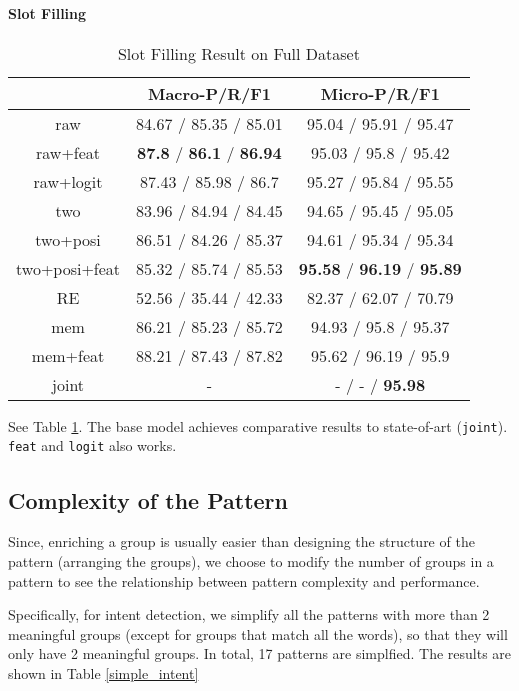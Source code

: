 \paragraph{Slot Filling}
\begin{table}
\setlength{\tabcolsep}{0.23em}
\centering
\small{
\begin{tabular}{|c|c|c|}

\hline
  & Macro-P/R/F1 & Micro-P/R/F1  \\
\hline
raw &  84.67 / 85.35 / 85.01            & 95.04 / 95.91 / 95.47  \\
\hline
raw+feat & \textbf{87.8} / \textbf{86.1} / \textbf{86.94} & 95.03 / 95.8 / 95.42  \\
\hline
raw+logit & 87.43 / 85.98 / 86.7        & 95.27 / 95.84 / 95.55  \\
\hline
two & 83.96 / 84.94 / 84.45             & 94.65 / 95.45 / 95.05 \\
\hline
two+posi & 86.51 / 84.26 / 85.37        & 94.61 / 95.34 / 95.34  \\
\hline
two+posi+feat & 85.32 / 85.74 / 85.53   & \textbf{95.58} / \textbf{96.19} / \textbf{95.89} \\
\hline
\hline
RE & 52.56 / 35.44 / 42.33 & 82.37 / 62.07 / 70.79 \\
\hline
mem & 86.21 / 85.23 / 85.72 & 94.93 / 95.8 / 95.37 \\
\hline
mem+feat & 88.21 / 87.43 / 87.82 & 95.62 / 96.19 / 95.9 \\
\hline
joint & - & - / - / \textbf{95.98} \\
\hline 

\end{tabular}
}
\caption{Slot Filling Result on Full Dataset}
\label{tab_slot_full}
\end{table}

See Table \ref{tab_slot_full}. The base model achieves comparative results to state-of-art (\texttt{joint}).
\texttt{feat} and \texttt{logit} also works. 


\subsection{Complexity of the Pattern}
Since, enriching a group is usually easier than designing the structure of the pattern (arranging the groups), we choose to modify the number of groups in a pattern to see the relationship between pattern complexity and performance.

Specifically, for intent detection, we simplify all the patterns with more than 2 meaningful groups (except for groups that match all the words), so that they will only have 2 meaningful groups. In total, 17 patterns are simplfied. The results are shown in Table \ref{simple_intent}


